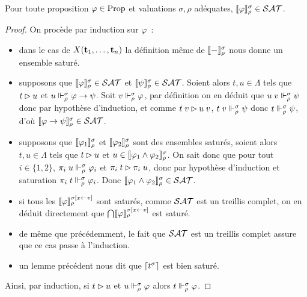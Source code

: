\documentclass{article}
\begin{document}
\begin{lem}[Saturation]
  Pour toute proposition $\varphi \in \mathrm{Prop}$ et valuations $\sigma,\rho$ adéquates, $\llbracket \varphi \rrbracket_\rho^\sigma\in\mathcal {SAT}$.
\end{lem}

\begin{proof}
  On procède par induction sur $\varphi$~:  
  \begin{itemize}
  \item dans le cas de $X(\mathbf{t}_1,\ldots,\mathbf{t}_n)$ la définition même de $\llbracket - \rrbracket_\rho^\sigma$ nous donne un ensemble saturé.
  \item supposons que $\llbracket \varphi \rrbracket_\rho^\sigma\in\mathcal {SAT}$ et $\llbracket \psi \rrbracket_\rho^\sigma\in \mathcal {SAT}$. Soient alors $t,u\in\Lambda$ tels que $t\rhd u$ et $u \Vdash_\rho^\sigma \varphi \to \psi$. Soit $v\Vdash_\rho^\sigma\varphi$, par définition on en déduit que $u\;v\Vdash_\rho^\sigma \psi$ donc par hypothèse d'induction, et comme $t\;v\rhd u\;v$, $t\;v\Vdash_\rho^\sigma\psi$ donc $t\Vdash_\rho^\sigma\psi$, d'où $\llbracket \varphi\to\psi \rrbracket_\rho^\sigma \in\mathcal {SAT}$. 
  \item supposons que $\llbracket \varphi_1 \rrbracket_\rho^\sigma$ et $\llbracket \varphi_2 \rrbracket_\rho^\sigma$ sont des ensembles saturés, soient alors $t, u \in \Lambda$ tels que $t\rhd u$ et $u \in \llbracket \varphi_1\land \varphi_2 \rrbracket_\rho^\sigma$. On sait donc que pour tout $i\in\{1,2\}$, $\pi_i\;u \Vdash_\rho^\sigma \varphi_i$ et $\pi_i\;t\rhd\pi_i\;u$, donc par hypothèse d'induction et saturation $\pi_i\;t\Vdash_\rho^\sigma\varphi_i$. Donc $\llbracket \varphi_1\land\varphi_2 \rrbracket_\rho^\sigma\in\mathcal {SAT}$.
  \item si tous les $\llbracket \varphi \rrbracket_\rho^{\sigma[x\leftarrow v]}$ sont saturés, comme $\mathcal {SAT}$ est un treillis complet, on en déduit directement que $\bigcap \llbracket \varphi \rrbracket_\rho^{\sigma[x\leftarrow v]}$ est saturé.
  \item de même que précédemment, le fait que $\mathcal {SAT}$ est un treillis complet assure que ce cas passe à l'induction.
  \item un lemme précédent nous dit que $\lceil t^\sigma \rceil$ est bien saturé.
  \end{itemize}

  Ainsi, par induction, si $t\rhd u$ et $u\Vdash_\rho^\sigma \varphi$ alors $t\Vdash_\rho^\sigma\varphi$.
\end{proof}
\end{document}
